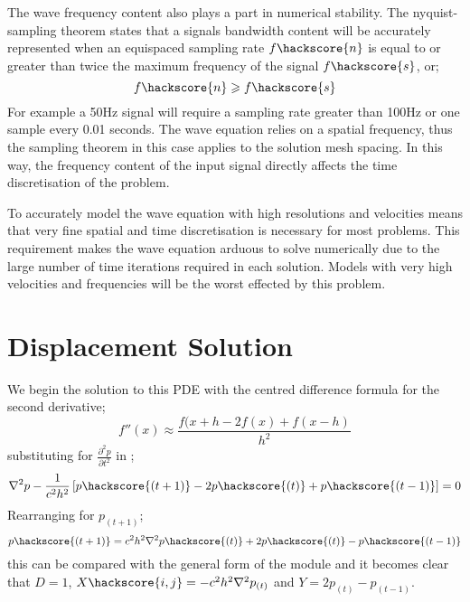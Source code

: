 The wave frequency content also plays a part in numerical stability. The
nyquist-sampling theorem states that a signals bandwidth content will be
accurately represented when an equispaced sampling rate $f \hackscore{n}$ is
equal to or greater than twice the maximum frequency of the signal
$f\hackscore{s}$, or;
\begin{equation} \label{eqn:samptheorem}
 f\hackscore{n} \geqslant f\hackscore{s}
\end{equation}
For example a 50Hz signal will require a sampling rate greater than 100Hz or
one sample every 0.01 seconds. The wave equation relies on a spatial frequency,
thus the sampling theorem in this case applies to the solution mesh spacing. In
this way, the frequency content of the input signal directly affects the time
discretisation of the problem.  

To accurately model the wave equation with high resolutions and velocities
means that very fine spatial and time discretisation is necessary for most
problems.
This requirement makes the wave equation arduous to
solve numerically due to the large number of time iterations required in each
solution. Models with very high velocities and frequencies will be the worst
effected by this problem.

\section{Displacement Solution}

We begin the solution to this PDE with the centred difference formula for the
second derivative;
\begin{equation}
 f''(x) \approx \frac{f(x+h - 2f(x) + f(x-h)}{h^2}
\label{eqn:centdiff}
\end{equation}
substituting  for $\frac{\partial ^2 p }{\partial t ^2}$
in ;
\begin{equation}
 \nabla ^2 p - \frac{1}{c^2h^2} \left[p\hackscore{(t+1)} - 2p\hackscore{(t)} +
p\hackscore{(t-1)} \right]
= 0
\label{eqn:waveu}
\end{equation}
Rearranging for $p_{(t+1)}$;
\begin{equation}
 p\hackscore{(t+1)} = c^2 h^2 \nabla ^2 p\hackscore{(t)} +2p\hackscore{(t)} -
p\hackscore{(t-1)}
\end{equation}
this can be compared with the general form of the \modLPDE module and it
becomes clear that $D=1$, $X\hackscore{i,j}=-c^2 h^2 \nabla ^2 p_{(t)}$ and
$Y=2p_{(t)} - p_{(t-1)}$.

